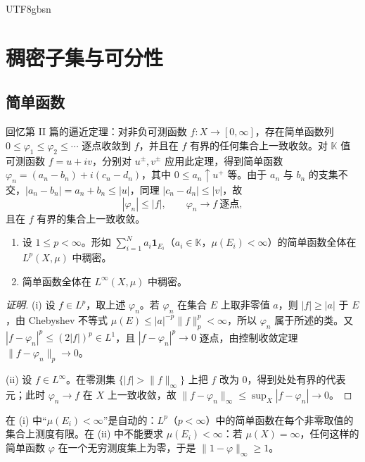 \documentclass[11pt]{article}
\newcommand{\K}{\mathbb{K}}
\newcommand{\norm}[1]{\lVert #1\rVert}
\newcommand{\ind}{\mathbf{1}}
\begin{document}
\begin{CJK*}{UTF8}{gbsn}
\section{稠密子集与可分性}

\subsection{简单函数}

回忆第 II 篇的逼近定理：对非负可测函数 $f:X\to[0,\infty]$，存在简单函数列 $0\le\varphi_{1}\le\varphi_{2}\le\cdots$ 逐点收敛到 $f$，并且在 $f$ 有界的任何集合上一致收敛。对 $\K$ 值可测函数 $f=u+iv$，分别对 $u^{\pm},v^{\pm}$ 应用此定理，得到简单函数 $\varphi_{n}=(a_{n}-b_{n})+i(c_{n}-d_{n})$，其中 $0\le a_{n}\uparrow u^{+}$ 等。由于 $a_{n}$ 与 $b_{n}$ 的支集不交，$|a_{n}-b_{n}|=a_{n}+b_{n}\le|u|$，同理 $|c_{n}-d_{n}|\le|v|$，故
\[
|\varphi_{n}|\le|f|,\qquad \varphi_{n}\to f\ \text{逐点},
\]
且在 $f$ 有界的集合上一致收敛。

\begin{theorem}\label{thm:simple-dense}
\begin{enumerate}
\item 设 $1\le p<\infty$。形如 $\sum_{i=1}^{N}a_{i}\ind_{E_{i}}$（$a_{i}\in\K$，$\mu(E_{i})<\infty$）的简单函数全体在 $L^{p}(X,\mu)$ 中稠密。
\item 简单函数全体在 $L^{\infty}(X,\mu)$ 中稠密。
\end{enumerate}
\end{theorem}

\begin{proof}[证明]
(i) 设 $f\in L^{p}$，取上述 $\varphi_{n}$。若 $\varphi_{n}$ 在集合 $E$ 上取非零值 $a$，则 $|f|\ge|a|$ 于 $E$，由 Chebyshev 不等式 $\mu(E)\le|a|^{-p}\norm{f}_{p}^{p}<\infty$，所以 $\varphi_{n}$ 属于所述的类。又 $|f-\varphi_{n}|^{p}\le(2|f|)^{p}\in L^{1}$，且 $|f-\varphi_{n}|^{p}\to0$ 逐点，由控制收敛定理 $\norm{f-\varphi_{n}}_{p}\to0$。

(ii) 设 $f\in L^{\infty}$。在零测集 $\{|f|>\norm{f}_{\infty}\}$ 上把 $f$ 改为 $0$，得到处处有界的代表元；此时 $\varphi_{n}\to f$ 在 $X$ 上一致收敛，故 $\norm{f-\varphi_{n}}_{\infty}\le\sup_{X}|f-\varphi_{n}|\to0$。
\end{proof}

\begin{remark}
在 (i) 中“$\mu(E_{i})<\infty$”是自动的：$L^{p}$（$p<\infty$）中的简单函数在每个非零取值的集合上测度有限。在 (ii) 中不能要求 $\mu(E_{i})<\infty$：若 $\mu(X)=\infty$，任何这样的简单函数 $\varphi$ 在一个无穷测度集上为零，于是 $\norm{1-\varphi}_{\infty}\ge1$。
\end{remark}


\end{CJK*}
\end{document}
